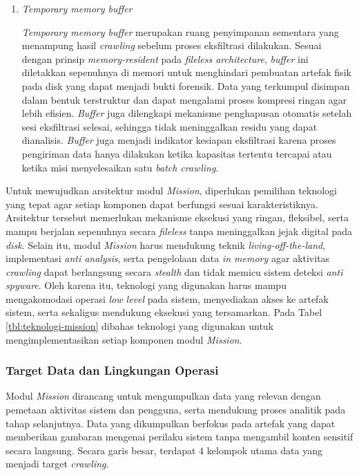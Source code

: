 \begin{enumerate}
   \item \textit{Temporary memory buffer}
   
   \textit{Temporary memory buffer} merupakan ruang penyimpanan sementara yang menampung hasil 
   \textit{crawling} sebelum proses eksfiltrasi dilakukan. Sesuai dengan prinsip \textit{memory-resident} 
   pada \textit{fileless architecture}, \textit{buffer} ini diletakkan sepenuhnya di memori untuk menghindari 
   pembuatan artefak fisik pada disk yang dapat menjadi bukti forensik. Data yang terkumpul 
   disimpan dalam bentuk terstruktur dan dapat mengalami proses kompresi ringan agar lebih 
   efisien. \textit{Buffer} juga dilengkapi mekanisme penghapusan otomatis setelah sesi eksfiltrasi 
   selesai, sehingga tidak meninggalkan residu yang dapat dianalisis. \textit{Buffer} juga menjadi 
   indikator kesiapan eksfiltrasi karena proses pengiriman data hanya dilakukan ketika 
   kapasitas tertentu tercapai atau ketika misi menyelesaikan satu \textit{batch crawling}.

\end{enumerate}

Untuk mewujudkan arsitektur modul \textit{Mission}, diperlukan pemilihan teknologi
yang tepat agar setiap komponen dapat berfungsi sesuai karakteristiknya.
Arsitektur tersebut memerlukan mekanisme eksekusi yang ringan, fleksibel, serta
mampu berjalan sepenuhnya secara \textit{fileless} tanpa meninggalkan jejak digital
pada \textit{disk}. Selain itu, modul \textit{Mission} harus mendukung teknik 
\textit{living-off-the-land}, implementasi \textit{anti analysis}, serta pengelolaan data 
\textit{in memory} agar aktivitas \textit{crawling} dapat berlangsung secara \textit{stealth} 
dan tidak memicu sistem deteksi \textit{anti spyware}. Oleh karena itu, teknologi yang 
digunakan harus mampu mengakomodasi operasi \textit{low level} pada sistem, menyediakan 
akses ke artefak sistem, serta sekaligus mendukung eksekusi yang tersamarkan. 
Pada Tabel \ref{tbl:teknologi-mission} dibahas teknologi yang digunakan untuk 
mengimplementasikan setiap komponen modul \textit{Mission}.



\subsubsection{Target Data dan Lingkungan Operasi}
\label{subsubsec:target-data-lingkungan-operasi}

Modul \textit{Mission} dirancang untuk mengumpulkan data yang relevan dengan 
pemetaan aktivitas sistem dan pengguna, serta mendukung proses analitik pada 
tahap selanjutnya. Data yang dikumpulkan berfokus pada artefak yang dapat 
memberikan gambaran mengenai perilaku sistem tanpa mengambil konten sensitif 
secara langsung. Secara garis besar, terdapat 4 kelompok utama data yang 
menjadi target \textit{crawling}.

